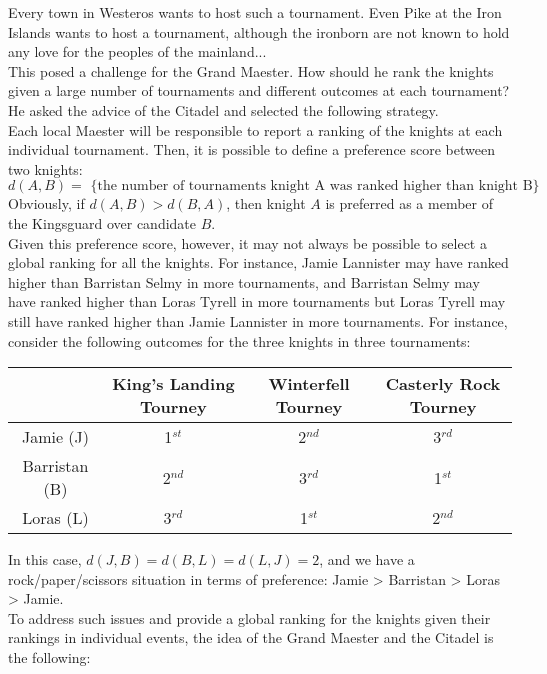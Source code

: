 \documentclass[11pt]{article}
\begin{document}
\noindent Every town in Westeros wants to host such a tournament. Even
Pike at the Iron Islands wants to host a tournament, although the
ironborn are not known to hold any love for the peoples of the
mainland...\\

\noindent This posed a challenge for the Grand Maester. How should he
rank the knights given a large number of tournaments and different
outcomes at each tournament? He asked the advice of the Citadel and
selected the following strategy.\\

\noindent Each local Maester will be responsible to report a ranking
of the knights at each individual tournament. Then, it is possible to
define a preference score between two knights:
$$d(A,B) = \textrm{ \{ the number of tournaments knight A was ranked
  higher than knight B\} }$$ Obviously, if $d(A,B) > d(B,A)$, then
knight $A$ is preferred as a member of the Kingsguard over candidate
$B$.\\

\noindent Given this preference score, however, it may not always be
possible to select a global ranking for all the knights. For instance,
Jamie Lannister may have ranked higher than Barristan Selmy in more
tournaments, and Barristan Selmy may have ranked higher than Loras
Tyrell in more tournaments but Loras Tyrell may still have ranked
higher than Jamie Lannister in more tournaments. For instance,
consider the following outcomes for the three knights in three
tournaments:

\begin{center}
\begin{tabular}{|c|c|c|c|}
\hline
& King's Landing Tourney  & Winterfell Tourney  & Casterly Rock
Tourney\\
\hline
Jamie (J) & 1$^{st}$ & 2$^{nd}$ & 3$^{rd}$\\
Barristan (B) & 2$^{nd}$ & 3$^{rd}$ & 1$^{st}$\\
Loras (L) & 3$^{rd}$ & 1$^{st}$ & 2$^{nd}$\\
\hline
\end{tabular}
\end{center}

\noindent In this case, $d(J,B) = d(B,L) = d(L,J) = 2$, and we have a
rock/paper/scissors situation in terms of preference: Jamie >
Barristan > Loras > Jamie. \\

\noindent To address such issues and provide a global ranking for the
knights given their rankings in individual events, the idea of the
Grand Maester and the Citadel is the following:\\
\end{document}
